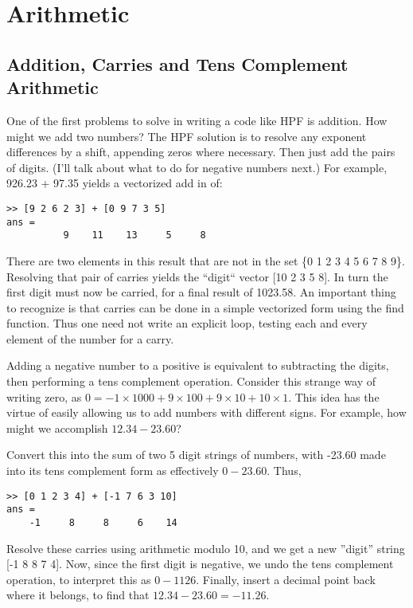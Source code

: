 \documentclass[a4paper,12pt]{article}
\begin{document}
\section{Arithmetic}

\subsection{Addition, Carries and Tens Complement Arithmetic}

One of the first problems to solve in writing a code like HPF is addition. How might we add two numbers? The HPF solution is to resolve any exponent differences by a shift, appending zeros where necessary. Then just add the pairs of digits. (I'll talk about what to do for negative numbers next.) For example, 926.23 + 97.35 yields a vectorized add in \Ml of:

\begin{lstlisting}
>> [9 2 6 2 3] + [0 9 7 3 5]
ans =
          9    11    13     5     8
\end{lstlisting}

There are two elements in this result that are not in the set \{0 1 2 3 4 5 6 7 8 9\}. Resolving that pair of carries yields the ``digit`` vector {[10 2 3 5 8]}. In turn the first digit must now be carried, for a final result of 1023.58. An important thing to recognize is that carries can be done in a simple vectorized form using the find function. Thus one need not write an explicit loop, testing each and every element of the number for a carry.

Adding a negative number to a positive is equivalent to subtracting the digits, then performing a tens complement operation. Consider this strange way of writing zero, as $0 = -1 \times 1000 + 9 \times 100 + 9 \times 10 + 10 \times 1$. This idea has the virtue of easily allowing us to add numbers with different signs. For example, how might we accomplish $12.34 - 23.60$?

Convert this into the sum of two 5 digit strings of numbers, with -23.60 made into its tens complement form as effectively $0 - 23.60$. Thus,

\begin{lstlisting}
>> [0 1 2 3 4] + [-1 7 6 3 10]
ans =
    -1     8     8     6    14
\end{lstlisting}

Resolve these carries using arithmetic modulo 10, and we get a new ''digit'' string {[-1 8 8 7 4]}. Now, since the first digit is negative, we undo the tens complement operation, to interpret this as $0 - 1126$. Finally, insert a decimal point back where it belongs, to find that $12.34 - 23.60 = -11.26$.
\end{document}
